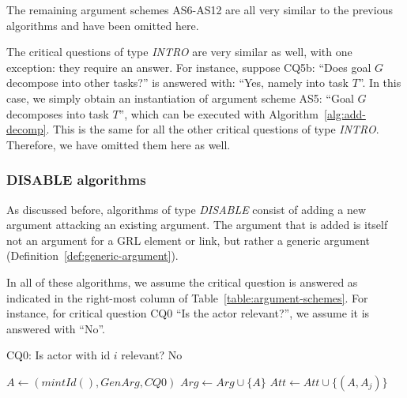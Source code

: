 The remaining argument schemes AS6-AS12 are all very similar to the previous algorithms and have been omitted here.

The critical questions of type \emph{INTRO} are very similar as well, with one exception: they require an answer. For instance, suppose CQ5b: ``Does goal $G$ decompose into other tasks?'' is answered with: ``Yes, namely into task $T$''. In this case, we simply obtain an instantiation of argument scheme AS5: ``Goal $G$ decomposes into task $T$'', which can be executed with Algorithm~\ref{alg:add-decomp}. This is the same for all the other critical questions of type \emph{INTRO}. Therefore, we have omitted them here as well.

\subsubsection{DISABLE algorithms}

As discussed before, algorithms of type \emph{DISABLE} consist of adding a new argument attacking an existing argument. The argument that is added is itself not an argument for a GRL element or link, but rather a generic argument (Definition~\ref{def:generic-argument}).

In all of these algorithms, we assume the critical question is answered as indicated in the right-most column of Table~\ref{table:argument-schemes}. For instance, for critical question CQ0 ``Is the actor relevant?'', we assume it is answered with ``No''.

\begin{algorithm}[h]
  \caption{CQ0: Is actor with id $i$ relevant? No}\label{alg:actor-not-relevant}
  \begin{algorithmic}[1]
    \State $A \leftarrow (mintId(),GenArg,CQ0)$\label{alg:actor-not-relevant:genarg}
    \State $Arg\leftarrow Arg \cup \{A\}$\label{alg:actor-not-relevant:genarg2}
    \label{alg:actor-not-relevant:for}
      \State $Att \leftarrow Att \cup \{(A,A_j)\}$\label{alg:actor-not-relevant:att}
    \EndFor
    \EndProcedure
  \end{algorithmic}
\end{algorithm}

